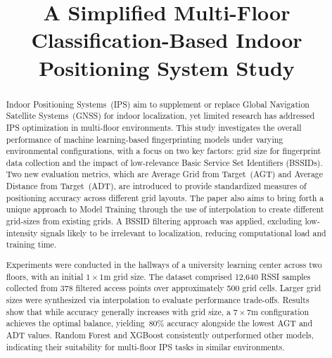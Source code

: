 \documentclass[runningheads]{llncs}
\begin{document}
%
\title{A Simplified Multi-Floor Classification-Based Indoor Positioning System Study}
%

%
\maketitle              %
%
\begin{abstract}
Indoor Positioning Systems~(IPS) aim to supplement or replace Global Navigation Satellite Systems~(GNSS) for indoor localization, yet limited research has addressed IPS optimization in multi-floor environments. This study investigates the overall performance of machine learning-based fingerprinting models under varying environmental configurations, with a focus on two key factors: grid size for fingerprint data collection and the impact of low-relevance Basic Service Set Identifiers (BSSIDs). Two new evaluation metrics, which are Average Grid from Target~(AGT) and Average Distance from Target~(ADT), are introduced to provide standardized measures of positioning accuracy across different grid layouts. The paper also aims to bring forth a unique approach to Model Training through the use of interpolation to create different grid-sizes from existing grids. A BSSID filtering approach was applied, excluding low-intensity signals likely to be irrelevant to localization, reducing computational load and training time.
 
  Experiments were conducted in the hallways of a university learning center across two floors, with an initial $1\times1$m grid size. The dataset comprised 12,640 RSSI samples collected from 378 filtered access points over approximately 500 grid cells. Larger grid sizes were synthesized via interpolation to evaluate performance trade-offs. Results show that while accuracy generally increases with grid size, a $7\times7$m configuration achieves the optimal balance, yielding~80\% accuracy alongside the lowest AGT and ADT values. Random Forest and XGBoost consistently outperformed other models, indicating their suitability for multi-floor IPS tasks in similar environments.

\end{abstract}
\end{document}
